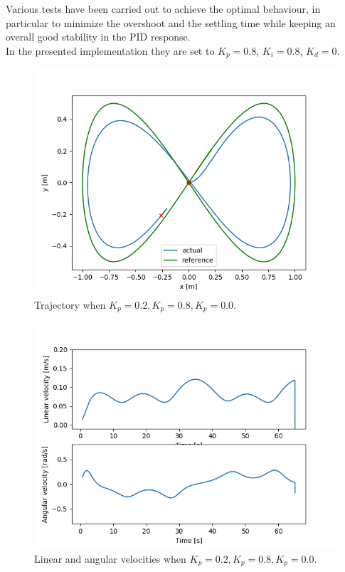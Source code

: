 \documentclass[11pt,a4paper]{article}
\begin{document}
Various tests have been carried out to achieve the optimal behaviour, in particular to minimize the overshoot and
the settling time while keeping an overall good stability in the PID response.\\

In the presented implementation they are set to $K_p = 0.8$, $K_i = 0.8$, $K_d = 0$.

\begin{figure}[H]
    \centering
    \includegraphics[scale=0.4]{different_params/custom_kp02/Trajectory.png}
    \caption{Trajectory when $K_p=0.2, K_p=0.8, K_p=0.0$.}
\end{figure}

\begin{figure}[H]
    \centering
    \includegraphics[scale=0.4]{different_params/custom_kp02/Linear_and_Angular_Velocities.png}
    \caption{Linear and angular velocities when $K_p=0.2, K_p=0.8, K_p=0.0$.}
\end{figure}
\end{document}
